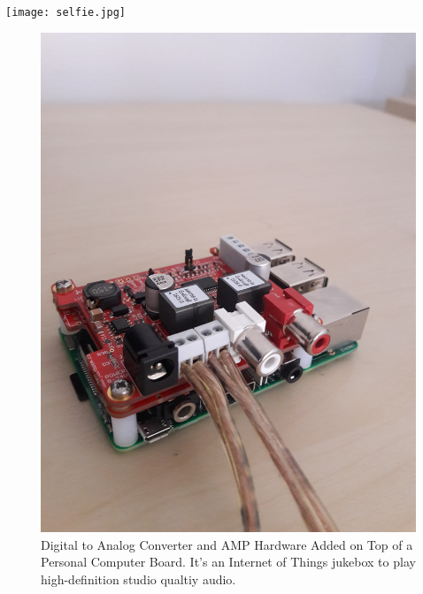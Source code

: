 \documentclass[10pt,foldmark,notumble]{leaflet}
\begin{document}
\texttt{[image: selfie.jpg]}
\newpage

\begin{figure}
\caption{Digital to Analog Converter
and AMP Hardware Added on Top of a Personal Computer Board.  It's an
Internet of Things jukebox to play high-definition studio qualtiy audio.}
\includegraphics[width=\textwidth,angle=-90]{pcb.jpg}
\end{figure}
\end{document}
